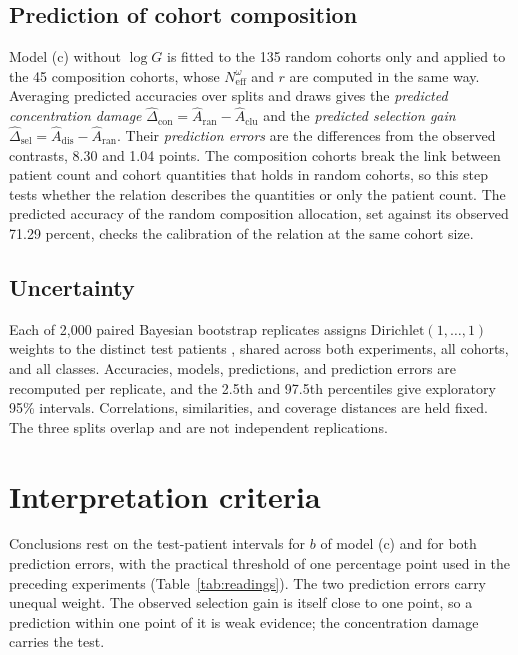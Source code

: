 \documentclass[11pt]{article}
\newcommand{\Neff}{N_{\mathrm{eff}}}
\begin{document}
\subsection{Prediction of cohort composition}
\label{sec:prediction}
Model (c) without $\log G$ is fitted to the 135 random cohorts only and applied to the 45 composition cohorts, whose $\Neff^{\omega}$ and $r$ are computed in the same way. Averaging predicted accuracies over splits and draws gives the \emph{predicted concentration damage} $\widehat\Delta_{\mathrm{con}}=\widehat A_{\mathrm{ran}}-\widehat A_{\mathrm{clu}}$ and the \emph{predicted selection gain} $\widehat\Delta_{\mathrm{sel}}=\widehat A_{\mathrm{dis}}-\widehat A_{\mathrm{ran}}$. Their \emph{prediction errors} are the differences from the observed contrasts, 8.30 and 1.04 points. The composition cohorts break the link between patient count and cohort quantities that holds in random cohorts, so this step tests whether the relation describes the quantities or only the patient count. The predicted accuracy of the random composition allocation, set against its observed 71.29 percent, checks the calibration of the relation at the same cohort size.

\subsection{Uncertainty}
\label{sec:uncertainty}
Each of 2,000 paired Bayesian bootstrap replicates assigns $\mathrm{Dirichlet}(1,\ldots,1)$ weights to the distinct test patients \citep{rubin1981bayesian}, shared across both experiments, all cohorts, and all classes. Accuracies, models, predictions, and prediction errors are recomputed per replicate, and the 2.5th and 97.5th percentiles give exploratory 95\% intervals. Correlations, similarities, and coverage distances are held fixed. The three splits overlap and are not independent replications.

\section{Interpretation criteria}
\label{sec:interpretation}
Conclusions rest on the test-patient intervals for $b$ of model (c) and for both prediction errors, with the practical threshold of one percentage point used in the preceding experiments (Table~\ref{tab:readings}). The two prediction errors carry unequal weight. The observed selection gain is itself close to one point, so a prediction within one point of it is weak evidence; the concentration damage carries the test.
\end{document}
